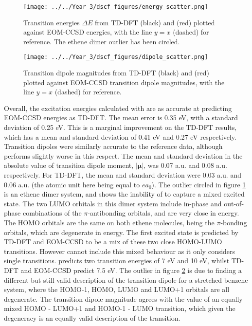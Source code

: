 \begin{figure}
\centering
\texttt{[image: ../../Year\_3/dscf\_figures/energy\_scatter.png]}
\caption{Transition energies $\Delta E$ from TD-DFT (black) and \dscf (red)
 plotted against EOM-CCSD energies, with the line $y=x$ (dashed) for reference.
 The ethene dimer outlier has been circled.}
\label{fig:energy_scatter}
\end{figure}

\begin{figure}
\centering
\texttt{[image: ../../Year\_3/dscf\_figures/dipole\_scatter.png]}
\caption{Transition dipole magnitudes from TD-DFT (black) and \dscf (red) plotted
against EOM-CCSD transition dipole magnitudes, with the line $y=x$ (dashed) for 
reference.}
\label{fig:dipole_scatter}
\end{figure}

Overall, the excitation energies calculated with \dscf are as accurate at predicting
EOM-CCSD energies as TD-DFT. The mean error is 0.35 eV, with a standard deviation
of 0.25 eV. This is a marginal improvement on the TD-DFT results, which has a mean
and standard deviation of 0.41 eV and 0.27 eV respectively. Transition dipoles 
were similarly accurate to the reference data, although \dscf performs slightly 
worse in this respect. The mean and standard deviation in the absolute value
of transition dipole moment, $|\mathbf{\mu}|$, was 0.07 a.u. and 0.08 a.u. respectively.
For TD-DFT, the mean and standard deviation were 0.03 a.u. and 0.06 a.u. (the atomic
unit here being equal to $ea_0$).
The outlier circled in figure \ref{fig:energy_scatter} is an ethene dimer system,
and shows the inability of \dscf to capture a mixed excited state. The two LUMO
orbitals in this dimer system include in-phase and out-of-phase combinations of the 
$\pi$-antibonding orbitals, and are very close in energy. The HOMO orbitals are
the same on both ethene molecules, being the $\pi$-bonding orbitals, which are
degenerate in energy. The first excited state is predicted by TD-DFT and EOM-CCSD
to be a mix of these two close HOMO-LUMO transitions. However \dscf cannot include
this mixed behaviour as it only considers single transitions. \dscf predicts two
transition energies of 7 eV and 10 eV, whilst TD-DFT and EOM-CCSD predict 7.5 eV.
The outlier in figure \ref{fig:dipole_scatter} is due to \dscf finding a different
but still valid description of the transition dipole for a stretched benzene system,
where the HOMO-1, HOMO, LUMO and LUMO+1 orbitals are all degenerate. The \dscf transition
dipole magnitude agrees with the value of an equally mixed HOMO - LUMO+1 and HOMO-1 
- LUMO transition, which given the degeneracy is an equally valid description of 
the transition.

